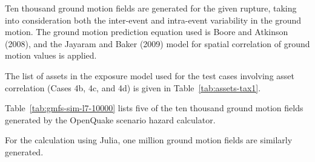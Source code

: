 Ten thousand ground motion fields are generated for the given rupture, taking into consideration both the inter-event and intra-event variability in the ground motion. The ground motion prediction equation used is Boore and Atkinson (2008), and the Jayaram and Baker (2009) model for spatial correlation of ground motion values is applied.



The list of assets in the exposure model used for the test cases involving asset correlation (Cases 4b, 4c, and 4d) is given in Table~\ref{tab:assets-tax1}.



Table~\ref{tab:gmfs-sim-l7-10000} lists five of the ten thousand ground motion fields generated by the OpenQuake scenario hazard calculator.

For the calculation using Julia, one million ground motion fields are similarly generated.